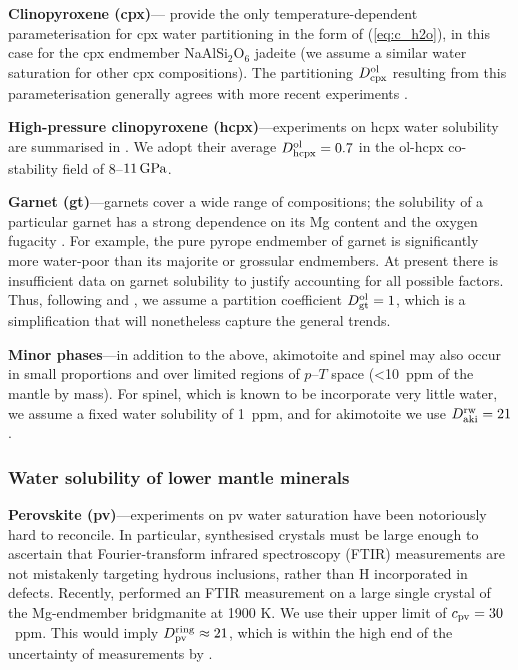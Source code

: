 \documentclass[fleqn,usenatbib]{mnras}
\begin{document}
\textbf{Clinopyroxene (cpx)}---\citet{bromiley_experimental_2004} provide the only temperature-dependent parameterisation for cpx water partitioning in the form of (\ref{eq:c_h2o}), in this case for the cpx endmember NaAlSi$_2$O$_6$ jadeite (we assume a similar water saturation for other cpx compositions). The partitioning $D^{\rm ol}_{\rm cpx}$ resulting from this parameterisation generally agrees with more recent experiments \citep{kovacs_experimental_2012, demouchy_subsolidus_2017, padron-navarta_subsolidus_2017}.

\textbf{High-pressure clinopyroxene (hcpx)}---experiments on hcpx water solubility are summarised in \citet{withers_h2o_2007}. We adopt their average $D^{\rm ol}_{\rm hcpx} = 0.7$ in the ol-hcpx co-stability field of 8--$11\,{\rm GPa}$. 

\textbf{Garnet (gt)}---garnets cover a wide range of compositions; the solubility of a particular garnet has a strong dependence on its Mg content and the oxygen fugacity \citep[e.g.,][]{mookherjee_solubility_2010, zhang_effects_2022}. For example, the pure pyrope endmember of garnet is significantly more water-poor than its majorite or grossular endmembers. At present there is insufficient data on garnet solubility to justify accounting for all possible factors. Thus, following \citet{demouchy_distribution_2016} and \citet{andrault_mantle_2022}, we assume a partition coefficient $D^{\rm ol}_{\rm gt} = 1$, which is a simplification that will nonetheless capture the general trends.

\textbf{Minor phases}---in addition to the above, akimotoite and spinel may also occur in small proportions and over limited regions of $p$--$T$ space (\textless 10~ppm of the mantle by mass). For spinel, which is known to be incorporate very little water, we assume a fixed water solubility of 1~ppm, and for akimotoite we use $D^{\rm rw}_{\rm aki} = 21$ \citep{keppler_thermodynamics_2006}.

\subsubsection{Water solubility of lower mantle minerals}\label{sec:sat_lm}


\hspace{\parindent} \textbf{Perovskite (pv)}---experiments on pv water saturation have been notoriously hard to reconcile. In particular, synthesised crystals must be large enough to ascertain that Fourier-transform infrared spectroscopy (FTIR) measurements are not mistakenly targeting hydrous inclusions, rather than H incorporated in defects. Recently, \citet{liu_bridgmanite_2021} performed an FTIR measurement on a large single crystal of the Mg-endmember bridgmanite at 1900 K. We use their upper limit of $c_{\rm pv} = 30$~ppm. This would imply $D^{\rm ring}_{\rm pv} \approx 21$, which is within the high end of the uncertainty of measurements by \citet{inoue_water_2010}. %
\end{document}
